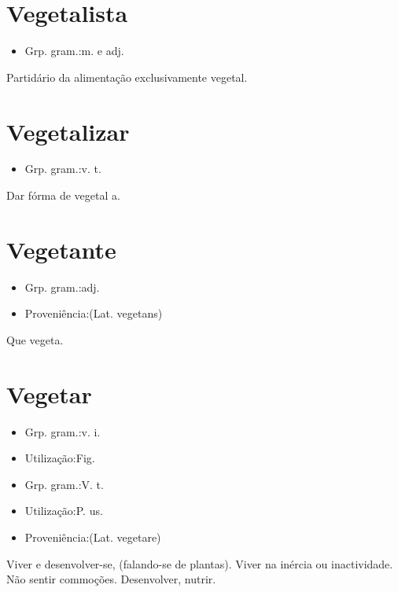 \documentclass{article}
\begin{document}
\section{Vegetalista}
\begin{itemize}
\item {Grp. gram.:m.  e  adj.}
\end{itemize}
Partidário da alimentação exclusivamente vegetal.
\section{Vegetalizar}
\begin{itemize}
\item {Grp. gram.:v. t.}
\end{itemize}
Dar fórma de vegetal a.
\section{Vegetante}
\begin{itemize}
\item {Grp. gram.:adj.}
\end{itemize}
\begin{itemize}
\item {Proveniência:(Lat. \textunderscore vegetans\textunderscore )}
\end{itemize}
Que vegeta.
\section{Vegetar}
\begin{itemize}
\item {Grp. gram.:v. i.}
\end{itemize}
\begin{itemize}
\item {Utilização:Fig.}
\end{itemize}
\begin{itemize}
\item {Grp. gram.:V. t.}
\end{itemize}
\begin{itemize}
\item {Utilização:P. us.}
\end{itemize}
\begin{itemize}
\item {Proveniência:(Lat. \textunderscore vegetare\textunderscore )}
\end{itemize}
Viver e desenvolver-se, (falando-se de plantas).
Viver na inércia ou inactividade.
Não sentir commoções.
Desenvolver, nutrir.
\end{document}
